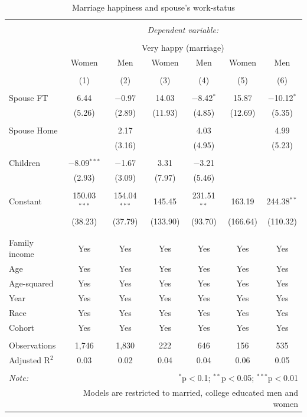 \documentclass[]{article}
\begin{document}
\begin{table}[!htbp] \centering 
  \caption{Marriage happiness and spouse's work-status} 
  \label{} 
\begin{tabular}{@{\extracolsep{5pt}}lcccccc} 
\\[-1.8ex]\hline 
\hline \\[-1.8ex] 
 & \multicolumn{6}{c}{\textit{Dependent variable:}} \\ 
\cline{2-7} 
\\[-1.8ex] & \multicolumn{6}{c}{Very happy (marriage)} \\ 
 & Women & Men & Women & Men & Women & Men \\ 
\\[-1.8ex] & (1) & (2) & (3) & (4) & (5) & (6)\\ 
\hline \\[-1.8ex] 
 Spouse FT & 6.44 & $-$0.97 & 14.03 & $-$8.42$^{*}$ & 15.87 & $-$10.12$^{*}$ \\ 
  & (5.26) & (2.89) & (11.93) & (4.85) & (12.69) & (5.35) \\ 
  & & & & & & \\ 
 Spouse Home &  & 2.17 &  & 4.03 &  & 4.99 \\ 
  &  & (3.16) &  & (4.95) &  & (5.23) \\ 
  & & & & & & \\ 
 Children & $-$8.09$^{***}$ & $-$1.67 & 3.31 & $-$3.21 &  &  \\ 
  & (2.93) & (3.09) & (7.97) & (5.46) &  &  \\ 
  & & & & & & \\ 
 Constant & 150.03$^{***}$ & 154.04$^{***}$ & 145.45 & 231.51$^{**}$ & 163.19 & 244.38$^{**}$ \\ 
  & (38.23) & (37.79) & (133.90) & (93.70) & (166.64) & (110.32) \\ 
  & & & & & & \\ 
\hline \\[-1.8ex] 
Family income & Yes & Yes & Yes & Yes & Yes & Yes \\ 
Age & Yes & Yes & Yes & Yes & Yes & Yes \\ 
Age-squared & Yes & Yes & Yes & Yes & Yes & Yes \\ 
Year & Yes & Yes & Yes & Yes & Yes & Yes \\ 
Race & Yes & Yes & Yes & Yes & Yes & Yes \\ 
Cohort & Yes & Yes & Yes & Yes & Yes & Yes \\ 
\hline \\[-1.8ex] 
Observations & 1,746 & 1,830 & 222 & 646 & 156 & 535 \\ 
Adjusted R$^{2}$ & 0.03 & 0.02 & 0.04 & 0.04 & 0.06 & 0.05 \\ 
\hline 
\hline \\[-1.8ex] 
\textit{Note:}  & \multicolumn{6}{r}{$^{*}$p$<$0.1; $^{**}$p$<$0.05; $^{***}$p$<$0.01} \\ 
 & \multicolumn{6}{r}{Models are restricted to married, college educated men and women} \\ 
\end{tabular} 
\end{table}
\end{document}
